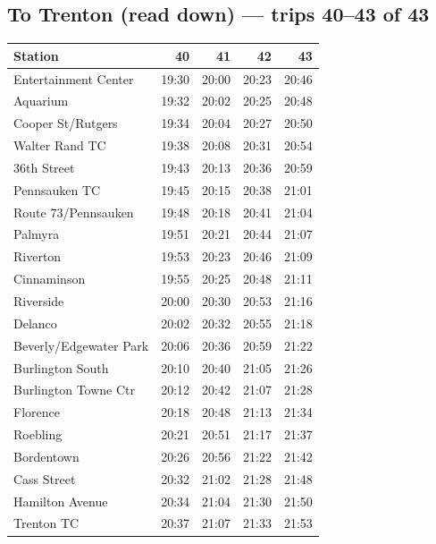 \subsection*{To Trenton (read down) --- trips 40--43 of 43}
\begin{center}\footnotesize\setlength{\tabcolsep}{3pt}\begin{tabular}{@{}lrrrr@{}}\toprule
Station & 40 & 41 & 42 & 43 \\\midrule
Entertainment Center & 19:30 & 20:00 & 20:23 & 20:46 \\
Aquarium & 19:32 & 20:02 & 20:25 & 20:48 \\
Cooper St/Rutgers & 19:34 & 20:04 & 20:27 & 20:50 \\
Walter Rand TC & 19:38 & 20:08 & 20:31 & 20:54 \\
36th Street & 19:43 & 20:13 & 20:36 & 20:59 \\
Pennsauken TC & 19:45 & 20:15 & 20:38 & 21:01 \\
Route 73/Pennsauken & 19:48 & 20:18 & 20:41 & 21:04 \\
Palmyra & 19:51 & 20:21 & 20:44 & 21:07 \\
Riverton & 19:53 & 20:23 & 20:46 & 21:09 \\
Cinnaminson & 19:55 & 20:25 & 20:48 & 21:11 \\
Riverside & 20:00 & 20:30 & 20:53 & 21:16 \\
Delanco & 20:02 & 20:32 & 20:55 & 21:18 \\
Beverly/Edgewater Park & 20:06 & 20:36 & 20:59 & 21:22 \\
Burlington South & 20:10 & 20:40 & 21:05 & 21:26 \\
Burlington Towne Ctr & 20:12 & 20:42 & 21:07 & 21:28 \\
Florence & 20:18 & 20:48 & 21:13 & 21:34 \\
Roebling & 20:21 & 20:51 & 21:17 & 21:37 \\
Bordentown & 20:26 & 20:56 & 21:22 & 21:42 \\
Cass Street & 20:32 & 21:02 & 21:28 & 21:48 \\
Hamilton Avenue & 20:34 & 21:04 & 21:30 & 21:50 \\
Trenton TC & 20:37 & 21:07 & 21:33 & 21:53 \\
\bottomrule\end{tabular}\end{center}
